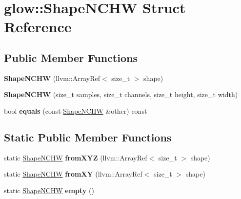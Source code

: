 \hypertarget{structglow_1_1_shape_n_c_h_w}{}\section{glow\+:\+:Shape\+N\+C\+HW Struct Reference}
\label{structglow_1_1_shape_n_c_h_w}
\subsection*{Public Member Functions}
\begin{DoxyCompactItemize}
\item 
\mbox{\label{structglow_1_1_shape_n_c_h_w_a490754e8d171b67e3e5d781bcbe0bb0e}} 
{\bfseries Shape\+N\+C\+HW} (llvm\+::\+Array\+Ref$<$ size\+\_\+t $>$ shape)
\item 
\mbox{\label{structglow_1_1_shape_n_c_h_w_a873086c7a9ecf0ae37d546c9908e4c47}} 
{\bfseries Shape\+N\+C\+HW} (size\+\_\+t samples, size\+\_\+t channels, size\+\_\+t height, size\+\_\+t width)
\item 
\mbox{\label{structglow_1_1_shape_n_c_h_w_acaf8cd0c824638a2228f9578acfa0751}} 
bool {\bfseries equals} (const \hyperlink{structglow_1_1_shape_n_c_h_w}{Shape\+N\+C\+HW} \&other) const
\end{DoxyCompactItemize}
\subsection*{Static Public Member Functions}
\begin{DoxyCompactItemize}
\item 
\mbox{\label{structglow_1_1_shape_n_c_h_w_ae13afb7e463ab425800dcc0943000ab6}} 
static \hyperlink{structglow_1_1_shape_n_c_h_w}{Shape\+N\+C\+HW} {\bfseries from\+X\+YZ} (llvm\+::\+Array\+Ref$<$ size\+\_\+t $>$ shape)
\item 
\mbox{\label{structglow_1_1_shape_n_c_h_w_a3ed599700a7508b3011c77934e97c29c}} 
static \hyperlink{structglow_1_1_shape_n_c_h_w}{Shape\+N\+C\+HW} {\bfseries from\+XY} (llvm\+::\+Array\+Ref$<$ size\+\_\+t $>$ shape)
\item 
\mbox{\label{structglow_1_1_shape_n_c_h_w_a07afeb5b4d9335bcd0f32fffeea65711}} 
static \hyperlink{structglow_1_1_shape_n_c_h_w}{Shape\+N\+C\+HW} {\bfseries empty} ()
\end{DoxyCompactItemize}
